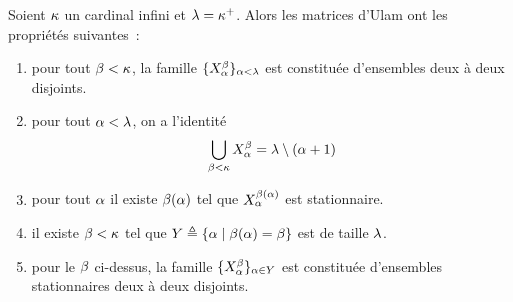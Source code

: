 \begin{property}
  Soient $\kappa$ un cardinal infini et $\lambda = \kappa^{+}$. Alors les
  matrices d'Ulam ont les propriétés suivantes~:
  \begin{enumerate}[label=(\roman*)]
  \item\label{enum.ulam1} pour tout $\beta < \kappa$, la famille
    $\{X_{\alpha}^{\beta}\}_{\alpha < \lambda}$ est constituée d'ensembles deux
    à deux disjoints.
  \item\label{enum.ulam2} pour tout $\alpha < \lambda$, on a l'identité
    \[\bigcup_{\beta < \kappa} X_{\alpha}^{\beta} =
    \lambda \setminus (\alpha + 1)\]
  \item pour tout $\alpha$ il existe $\beta(\alpha)$ tel que
    $X_{\alpha}^{\beta(\alpha)}$ est stationnaire.
  \item il existe $\beta < \kappa$ tel que
    $Y \triangleq \left\{ \alpha \;\middle\vert\; \beta(\alpha) = \beta \right\}$ est de taille $\lambda$.
  \item pour le $\beta$ ci-dessus, la famille
    $\{X_{\alpha}^{\beta}\}_{\alpha \in Y}$ est constituée d'ensembles
    stationnaires deux à deux disjoints.
  \end{enumerate}
\end{property}


